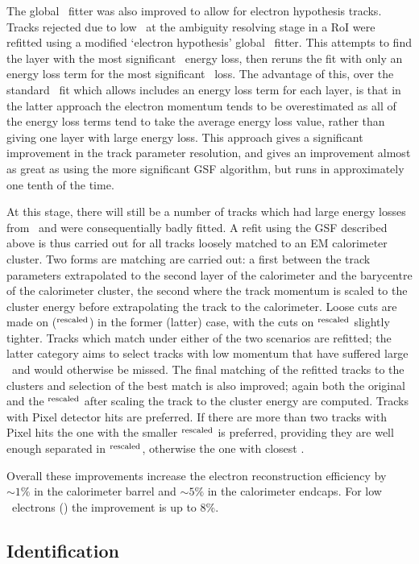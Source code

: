 The global \chisquared\
fitter was also improved to allow for electron hypothesis tracks. Tracks
rejected due to low \chisquared\ at the ambiguity resolving stage in a RoI were
refitted using a modified `electron hypothesis' global \chisquared\ fitter. This
attempts to find the layer with the most significant \brem\ energy loss, then
reruns the fit with only an energy loss term for the most significant \brem\
loss. The advantage of this, over the standard \chisquared\ fit which allows
includes an energy loss term for each layer, is that in the latter approach the
electron momentum tends to be overestimated as all of the energy loss terms tend
to take the average energy loss value, rather than giving one layer with large
energy loss. This approach gives a significant improvement in the track
parameter resolution, and gives an improvement almost as great as using the more
significant GSF algorithm, but runs in approximately one tenth of the time.

At this stage, there will still be a number of tracks which had large energy
losses from \brem\ and were consequentially badly fitted. A refit using the GSF
described above is thus carried out for all tracks loosely matched to an
EM calorimeter cluster. Two forms are matching are carried out: a first between the
track parameters extrapolated to the second layer of the calorimeter and the
barycentre of the calorimeter cluster, the second where the track momentum is
scaled to the cluster energy before extrapolating the track to the calorimeter.
Loose cuts are made on \deltaR (\deltaR$^{\rm{rescaled}}$) in the former
(latter) case, with the cuts on \deltaR$^{\rm{rescaled}}$ slightly tighter.
Tracks which match under either of the two scenarios are refitted; the latter
category aims to select tracks with low momentum that have suffered large
\brem\ and would otherwise be missed. The final matching of the refitted tracks
to the clusters and selection of the best match is also improved; again both the
original \deltaR and the \deltaR$^{\rm{rescaled}}$ after scaling the track to the cluster
energy are computed. Tracks with Pixel detector hits are preferred. If there are
more than two tracks with Pixel hits the one with the smaller
\deltaR$^{\rm{rescaled}}$ is preferred, providing they are well enough
separated in \deltaR$^{\rm{rescaled}}$, otherwise the one with closest \deltaR.

Overall these improvements increase the electron reconstruction efficiency by
$\sim 1\%$ in the calorimeter barrel and $\sim 5\%$ in the calorimeter endcaps.
For low \et\ electrons (\etlt{20}) the improvement is up to 8\%.

\subsection{Identification}
\label{sec:reco-el-id}

